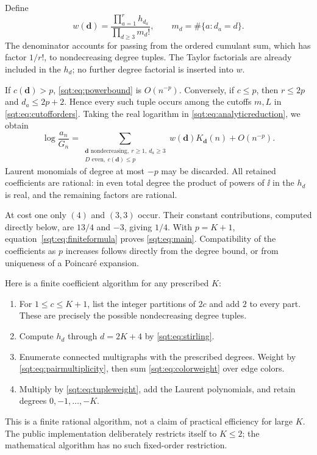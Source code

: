 Define
\begin{equation}\label{sqt:eq:tupleweight}
w(\boldsymbol d)=\frac{\prod_{a=1}^r h_{d_a}}{\prod_{d\geq3}m_d!},
\qquad m_d=\#\{a:d_a=d\}.
\end{equation}
The denominator accounts for passing from the ordered cumulant sum, which has factor $1/r!$, to nondecreasing degree tuples. The Taylor factorials are already included in the $h_d$; no further degree factorial is inserted into $w$.

If $c(\boldsymbol d)>p$, \eqref{sqt:eq:powerbound} is $O(n^{-p})$. Conversely, if $c\leq p$, then $r\leq2p$ and $d_a\leq2p+2$. Hence every such tuple occurs among the cutoffs $m,L$ in \eqref{sqt:eq:cutofforders}. Taking the real logarithm in \eqref{sqt:eq:analyticreduction}, we obtain
\begin{equation}\label{sqt:eq:finiteformula}
\log\frac{a_n}{G_n}
 =\sum_{\substack{\boldsymbol d\text{ nondecreasing},\ r\geq1,\ d_a\geq3\\
                  D\text{ even},\ c(\boldsymbol d)\leq p}}
 w(\boldsymbol d)K_{\boldsymbol d}(n)+O(n^{-p}).
\end{equation}
Laurent monomials of degree at most $-p$ may be discarded. All retained coefficients are rational: in even total degree the product of powers of $\ii$ in the $h_d$ is real, and the remaining factors are rational.

At cost one only $(4)$ and $(3,3)$ occur. Their constant contributions, computed directly below, are $13/4$ and $-3$, giving $1/4$. With $p=K+1$, equation~\eqref{sqt:eq:finiteformula} proves \eqref{sqt:eq:main}. Compatibility of the coefficients as $p$ increases follows directly from the degree bound, or from uniqueness of a Poincar\'e expansion.

Here is a finite coefficient algorithm for any prescribed $K$:
\begin{enumerate}
\item For $1\leq c\leq K+1$, list the integer partitions of $2c$ and add $2$ to every part. These are precisely the possible nondecreasing degree tuples.
\item Compute $h_d$ through $d=2K+4$ by \eqref{sqt:eq:stirling}.
\item Enumerate connected multigraphs with the prescribed degrees. Weight by \eqref{sqt:eq:pairmultiplicity}, then sum \eqref{sqt:eq:colorweight} over edge colors.
\item Multiply by \eqref{sqt:eq:tupleweight}, add the Laurent polynomials, and retain degrees $0,-1,\ldots,-K$.
\end{enumerate}
This is a finite rational algorithm, not a claim of practical efficiency for large $K$. The public implementation deliberately restricts itself to $K\leq2$; the mathematical algorithm has no such fixed-order restriction.

